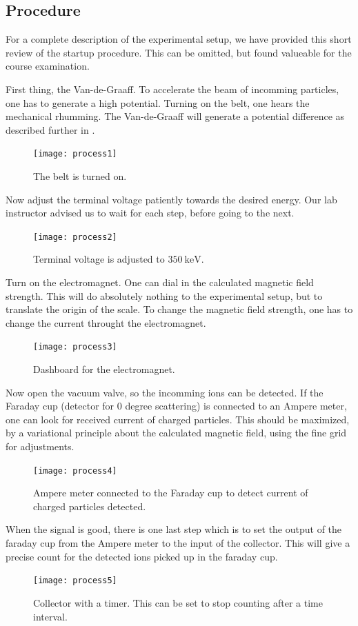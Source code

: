 \subsection{Procedure}\label{sec_procedure}
For a complete description of the experimental setup, we have provided this
short review of the startup procedure. This can be omitted, but found valueable
for the course examination.

First thing, the Van-de-Graaff. To accelerate the beam of incomming particles,
one has to generate a high potential. Turning on the belt, one hears the
mechanical rhumming. The Van-de-Graaff will generate a potential difference as described
further in \cite[p. 565]{krane}.
\begin{figure}[h!]
\centering
\texttt{[image: process1]}
\caption{The belt is turned on.}
\label{fig_process1}
\end{figure}

Now adjust the terminal voltage patiently towards the desired energy. Our lab
instructor advised us to wait for each step, before going to the next.
\begin{figure}[h!]
\centering
\texttt{[image: process2]}
\caption{Terminal voltage is adjusted to $\SI{350}{\kilo\electronvolt}$.}
\label{fig_process2}
\end{figure}

Turn on the electromagnet. One can dial in the calculated magnetic field
strength. This will do absolutely nothing to the experimental setup, but to
translate the origin of the scale. To change the magnetic field strength, one
has to change the current throught the electromagnet.
\begin{figure}[h!]
\centering
\texttt{[image: process3]}
\caption{Dashboard for the electromagnet.}
\label{fig_process3}
\end{figure}

Now open the vacuum valve, so the incomming ions can be detected.
If the Faraday cup (detector for $0$ degree scattering) is connected to an Ampere
meter, one can look for received current of charged particles. This should be
maximized, by a variational principle about the calculated magnetic field,
using the fine grid for adjustments.

\begin{figure}[h!]
\centering
\texttt{[image: process4]}
\caption{Ampere meter connected to the Faraday cup to detect current of charged
particles detected.}
\label{fig_process4}
\end{figure}
When the signal is good, there is one last step which is to set the output of
the faraday cup from the Ampere meter to the input of the collector. This will
give a precise count for the detected ions picked up in the faraday cup.
\begin{figure}[b]
\centering
\texttt{[image: process5]}
\caption{Collector with a timer. This can be set to stop counting after a time
interval.}
\label{fig_process5}
\end{figure}







